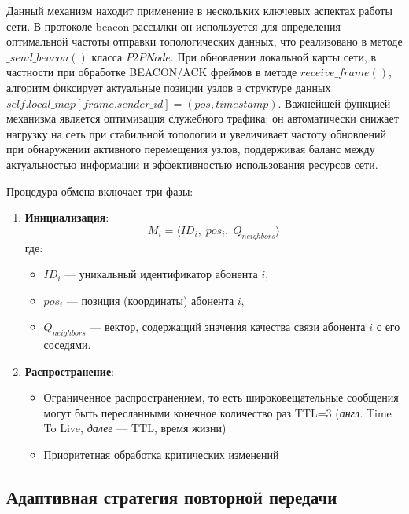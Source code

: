 Данный механизм находит применение в нескольких ключевых аспектах работы сети. В протоколе beacon-рассылки он используется для определения оптимальной 
частоты отправки топологических данных, что реализовано в методе $\_send\_beacon()$ класса $P2PNode$. При обновлении локальной карты сети, в частности при 
обработке BEACON/ACK фреймов в методе $receive\_frame()$, алгоритм фиксирует актуальные позиции узлов в структуре данных 
$self.local\_map[frame.sender\_id] = (pos, timestamp)$. Важнейшей функцией механизма является оптимизация служебного трафика: он автоматически снижает 
нагрузку на сеть при стабильной топологии и увеличивает частоту обновлений при обнаружении активного перемещения узлов, поддерживая баланс между 
актуальностью информации и эффективностью использования ресурсов сети.

Процедура обмена включает три фазы:

\begin{enumerate}[1.]
    \item \textbf{Инициализация}:
    \begin{equation}
    M_i = \langle ID_i, \; pos_i, \; Q_{neighbors} \rangle
    \end{equation}
    где:
    \begin{itemize}
        \item $ID_i$ — уникальный идентификатор абонента $i$,
        \item $pos_i$ — позиция (координаты) абонента $i$,
        \item $Q_{neighbors}$ — вектор, содержащий значения качества связи абонента $i$ с его соседями.
    \end{itemize}    

    \item \textbf{Распространение}:
    \begin{itemize}
    \item Ограниченное распространением, то есть широковещательные сообщения могут быть пересланными конечное количество раз TTL=3 (\textit{англ.} Time To Live, \textit{далее} — TTL, время жизни) 
    \item Приоритетная обработка критических изменений
    \end{itemize}
\end{enumerate}


\subsection{Адаптивная стратегия повторной передачи} \label{ch2:sec2:sub5}

